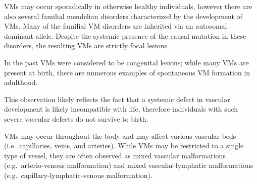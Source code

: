 VMs may occur sporadically in otherwise healthy individuals, however there are also several familial mendelian disorders characterized by the development of VMs. Many of the familial VM disorders are inherited via an autosomal dominant allele. Despite the systemic presence of the causal mutation in these disorders, the resulting VMs are strictly focal lesions








In the past VMs were considered to be congenital lesions; while many VMs are present at birth, there are numerous examples of spontaneous  VM formation in adulthood. 



This observation likely reflects the fact that a systemic defect in vascular development is likely incompatible with life, therefore individuals with such severe vascular defects do not survive to birth. 



VMs may occur throughout the body and may affect various vascular beds (i.e.~capillaries, veins, and arteries). While VMs may be restricted to a single type of vessel, they are often observed as mixed vascular malformations (e.g.~arterio-venous malformation) and mixed vascular-lymphatic malformations (e.g.~capillary-lymphatic-venous malformation). 















